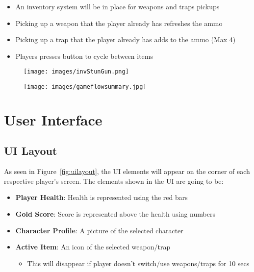 \documentclass[10pt]{report}
\begin{document}
\begin{minipage}{.8\linewidth}
    \begin{itemize}
        \item An inventory system will be in place for weapons and traps pickups
        \item Picking up a weapon that the player already has refreshes the ammo
        \item Picking up a trap that the player already has adds to the ammo (Max 4)
        \item Players presses button to cycle between items    
    \end{itemize}
\end{minipage}\hfill
\begin{minipage}{.18\linewidth}
    \begin{figure}[H]
        \texttt{[image: images/invStunGun.png]}
    \end{figure}
\end{minipage}


\begin{figure}
    \texttt{[image: images/gameflowsummary.jpg]}
\end{figure}


\chapter{User Interface}

\section{UI Layout}

As seen in Figure~\ref{fig:uilayout}, the UI elements will appear on the corner of each respective player's screen. The elements shown in the UI are going to be:

\begin{itemize}
    \item \textbf{Player Health}: Health is represented using the red bars
    \item \textbf{Gold Score}: Score is represented above the health using numbers
    \item \textbf{Character Profile}: A picture of the selected character
    \item \textbf{Active Item}: An icon of the selected weapon/trap 
    \begin{itemize}
        \item This will disappear if player doesn’t switch/use weapons/traps for 10 secs
    \end{itemize}
\end{itemize}
\end{document}
